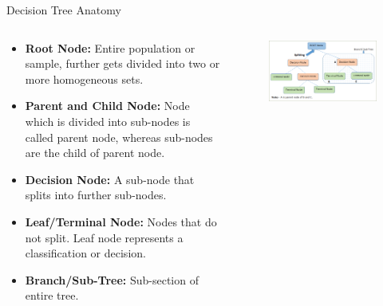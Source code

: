 \documentclass[document.tex]{subfiles}
\begin{document}
    \begin{frame}{Decision Tree Anatomy}
        \begin{columns}
            \begin{column}{0.5\textwidth}
                \begin{itemize}
                    \item \textbf{Root Node:} Entire population or sample, further gets divided into two or more homogeneous sets.
                    \item \textbf{Parent and Child Node:} Node which is divided into sub-nodes is called parent node, whereas sub-nodes are the child of parent node.
                    \item \textbf{Decision Node:} A sub-node that splits into further sub-nodes.
                    \item \textbf{Leaf/Terminal Node:} Nodes that do not split. Leaf node represents a classification or decision.
                    \item \textbf{Branch/Sub-Tree:} Sub-section of entire tree.
                \end{itemize}
            \end{column}
            \begin{column}{0.5\textwidth}
                \begin{figure}
                    \label{fig:decision-tree-anatomy}
                    \includegraphics[width=\textwidth, keepaspectratio]{figures/external/decision-tree-anatomy.png}
                \end{figure}
            \end{column}
        \end{columns}
    \end{frame}
\end{document}
